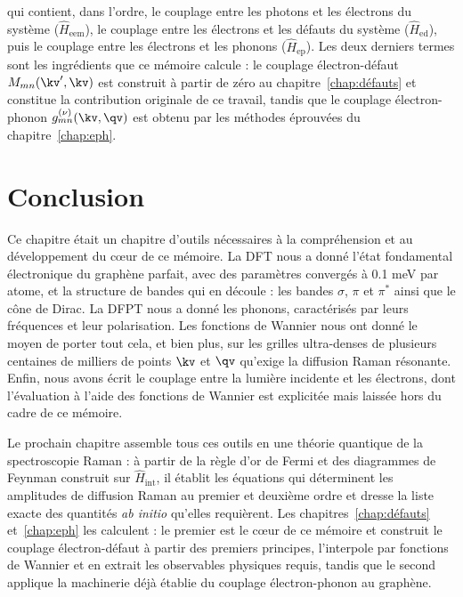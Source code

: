 qui contient, dans l'ordre, le couplage entre les photons et les électrons du système ($\hat{H}_\text{eem}$), le couplage entre les électrons et les défauts du système ($\hat{H}_\text{ed}$), puis le couplage entre les électrons et les phonons ($\hat{H}_\text{ep}$). Les deux derniers termes sont les ingrédients que ce mémoire calcule : le couplage électron-défaut $M_{mn}(\kv',\kv)$ est construit à partir de zéro au chapitre~\ref{chap:défauts} et constitue la contribution originale de ce travail, tandis que le couplage électron-phonon $g_{mn}^{(\nu)}(\kv,\qv)$ est obtenu par les méthodes éprouvées du chapitre~\ref{chap:eph}.

\section{Conclusion}

Ce chapitre était un chapitre d'outils nécessaires à la compréhension et au développement du c\oe ur de ce mémoire. La DFT nous a donné l'état fondamental électronique du graphène parfait, avec des paramètres convergés à 0.1 meV par atome, et la structure de bandes qui en découle : les bandes $\sigma$, $\pi$ et $\pi^*$ ainsi que le cône de Dirac. La DFPT nous a donné les phonons, caractérisés par leurs fréquences et leur polarisation. Les fonctions de Wannier nous ont donné le moyen de porter tout cela, et bien plus, sur les grilles ultra-denses de plusieurs centaines de milliers de points $\kv$ et $\qv$ qu'exige la diffusion Raman résonante. Enfin, nous avons écrit le couplage entre la lumière incidente et les électrons, dont l'évaluation à l'aide des fonctions de Wannier est explicitée mais laissée hors du cadre de ce mémoire.

Le prochain chapitre assemble tous ces outils en une théorie quantique de la spectroscopie Raman : à partir de la règle d'or de Fermi et des diagrammes de Feynman construit sur $\hat{H}_\text{int}$, il établit les équations qui déterminent les amplitudes de diffusion Raman au premier et deuxième ordre et dresse la liste exacte des quantités \textit{ab initio} qu'elles requièrent. Les chapitres~\ref{chap:défauts} et~\ref{chap:eph} les calculent : le premier est le c\oe ur de ce mémoire et construit le couplage électron-défaut à partir des premiers principes, l'interpole par fonctions de Wannier et en extrait les observables physiques requis, tandis que le second applique la machinerie déjà établie du couplage électron-phonon au graphène.